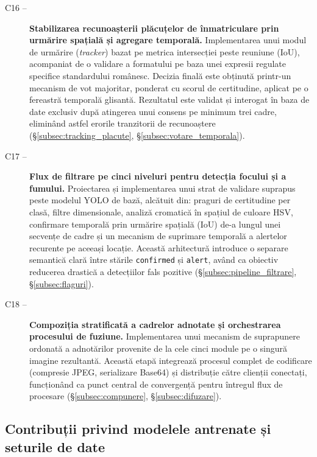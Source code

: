 \documentclass[../../main.tex]{subfiles}
\begin{document}
\begin{description}
	\item[C16 --] \textbf{Stabilizarea recunoașterii plăcuțelor de înmatriculare prin urmărire spațială și agregare temporală.} Implementarea unui modul de urmărire (\textit{tracker}) bazat pe metrica intersecției peste reuniune (IoU), acompaniat de o validare a formatului pe baza unei expresii regulate specifice standardului românesc. Decizia finală este obținută printr-un mecanism de vot majoritar, ponderat cu scorul de certitudine, aplicat pe o fereastră temporală glisantă. Rezultatul este validat și interogat în baza de date exclusiv după atingerea unui consens pe minimum trei cadre, eliminând astfel erorile tranzitorii de recunoaștere (\S\ref{subsec:tracking_placute}, \S\ref{subsec:votare_temporala}).

	\item[C17 --] \textbf{Flux de filtrare pe cinci niveluri pentru detecția focului și a fumului.} Proiectarea și implementarea unui strat de validare suprapus peste modelul YOLO de bază, alcătuit din: praguri de certitudine per clasă, filtre dimensionale, analiză cromatică în spațiul de culoare HSV, confirmare temporală prin urmărire spațială (IoU) de-a lungul unei secvențe de cadre și un mecanism de suprimare temporală a alertelor recurente pe aceeași locație. Această arhitectură introduce o separare semantică clară între stările \texttt{confirmed} și \texttt{alert}, având ca obiectiv reducerea drastică a detecțiilor fals pozitive (\S\ref{subsec:pipeline_filtrare}, \S\ref{subsec:flaguri}).

	\item[C18 --] \textbf{Compoziția stratificată a cadrelor adnotate și orchestrarea procesului de fuziune.} Implementarea unui mecanism de suprapunere ordonată a adnotărilor provenite de la cele cinci module pe o singură imagine rezultantă. Această etapă integrează procesul complet de codificare (compresie JPEG, serializare Base64) și distribuție către clienții conectați, funcționând ca punct central de convergență pentru întregul flux de procesare (\S\ref{subsec:compunere}, \S\ref{subsec:difuzare}).
\end{description}

\subsection{Contribuții privind modelele antrenate și seturile de date}
\label{subsec:contributii_modele}
\end{document}
